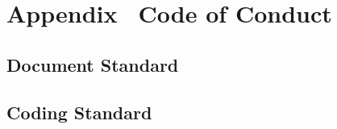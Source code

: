 \section*{Appendix \thesection \, \textbar \vspace{0.5em} Code of Conduct}
\label{sec:appendix-code-of-conduct}
%

\subsection*{Document Standard}
\label{subsec:document-standard}

\subsection*{Coding Standard}
\label{subsec:coding-standard}